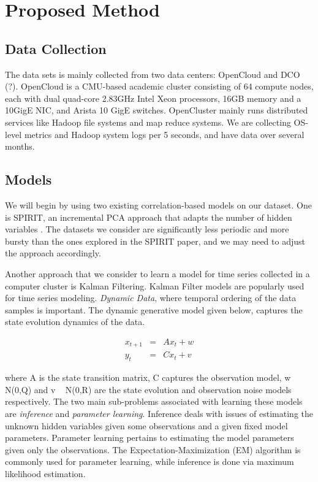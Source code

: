 \section{Proposed Method}
\label{sec:method}

\subsection{Data Collection}
\label{sec:method:data}
The data sets is mainly collected from two data centers: OpenCloud and DCO (?). OpenCloud is a CMU-based academic cluster consisting of 64 compute nodes, each with dual quad-core 2.83GHz Intel Xeon processors, 16GB memory and a 10GigE NIC, and Arista 10 GigE switches. OpenCluster mainly runs distributed services like Hadoop file systems and map reduce systems. We are collecting OS-level metrics and Hadoop system logs per 5 seconds, and have data over several months.

\subsection{Models}
\label{sec:method:models}
We will begin by using two existing correlation-based models on our dataset. One is SPIRIT, an incremental PCA approach that adapts the number of hidden variables \cite{Papdimitriou2005}. The datasets we consider are significantly less periodic and more bursty than the ones explored in the SPIRIT paper, and we may need to adjust the approach accordingly.

Another approach that we consider to learn a model for time series collected in a computer cluster is Kalman Filtering. Kalman Filter models are popularly used for time series modeling. \emph{Dynamic Data}, where temporal ordering of the data samples is important. The dynamic generative model given below, captures the state evolution dynamics of the data.

\begin{eqnarray}
x_{t+1} &=& Ax_t + w \\
y_t  &=& Cx_t + v
\end{eqnarray}

where A is the state transition matrix, C captures the observation model, w ~ N(0,Q) and v ~ N(0,R) are the state evolution and observation noise models respectively. The two main sub-problems associated with learning these models are \emph{inference} and \emph{parameter learning}. Inference deals with issues of estimating the unknown hidden variables given some observations and a given fixed model parameters. Parameter learning pertains to estimating the model parameters given only the  observations. The Expectation-Maximization (EM) algorithm is commonly used for parameter learning, while inference is done via maximum likelihood estimation.

